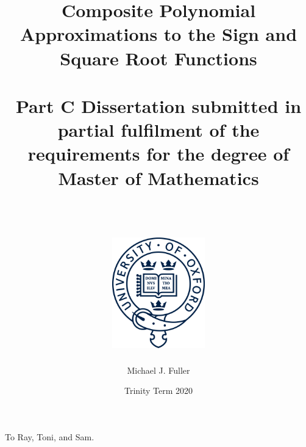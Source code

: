 \documentclass[a4paper,12pt,twoside]{report}
\title{\textbf{Composite Polynomial Approximations to the Sign and Square Root Functions}\\~\\{\large Part C Dissertation submitted in partial fulfilment of the requirements for the degree of Master of Mathematics}\\~\\~\\
\includegraphics[width=0.3\textwidth]{figures/oxlogo.png}}
\author{Michael J. Fuller}
\date{Trinity Term 2020}%
\theoremstyle{plain}
\theoremstyle{remark}
\theoremstyle{definition}
\newenvironment{dedication}
  {\clearpage           %
   \thispagestyle{empty}%
   \vspace*{\stretch{1}}%
   \itshape             %
   \raggedleft          %
  }
  {\par %
   \vspace{\stretch{3}} %
   \clearpage           %
  }
\begin{document}
\begin{titlepage}
\maketitle
\restoregeometry
\end{titlepage}

\begin{dedication}
To Ray, Toni, and Sam.
\end{dedication}

\newpage



\tableofcontents









\newpage
\thispagestyle{empty}
\mbox{}
\vfill



\vfill

\newpage
{}
\renewcommand{\bibname}{References}
\printbibliography
\end{document}
